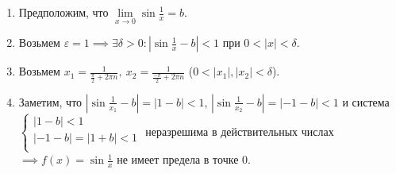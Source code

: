 \documentclass{article}
\begin{document}
    \begin{enumerate}
        \item Предположим, что \(\displaystyle \lim\limits_{x \to 0}\sin{\frac{1}{x}} = b\).
        \item Возьмем \(\varepsilon = 1 \implies \exists \delta > 0: \left \vert \sin{\frac{1}{x}} - b \right \vert < 1\) при \(0 < |x| < \delta\).
        \item Возьмем \(\displaystyle x_{1} = \frac{1}{\frac{\pi}{2} + 2\pi n},\ x_{2} = \frac{1}{\frac{-\pi}{2} + 2\pi n}\) (\(0 < |x_{1}|, |x_{2}| < \delta\)).
        \item Заметим, что \(\displaystyle \left \vert \sin{\frac{1}{x_{1}}} - b \right \vert = |1 - b| < 1\), \(\displaystyle \left \vert \sin{\frac{1}{x_{2}}} - b \right \vert = |-1-b| < 1\) и система
        \(\begin{cases}
            |1 - b| < 1\\
            | -1 - b| = |1 + b| < 1\\  
        \end{cases}\) неразрешима в действительных числах \(\implies f(x) = \sin{\frac{1}{x}}\) не имеет предела в точке 0.
    \end{enumerate}
\end{document}
